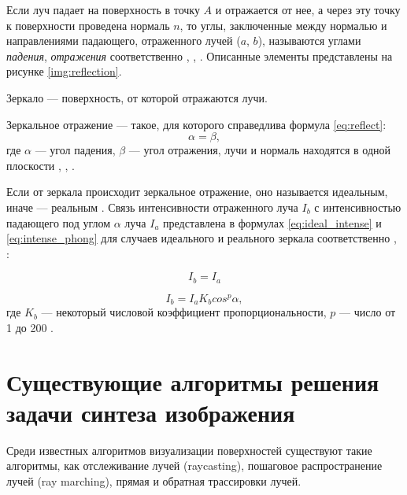 Если луч падает на поверхность в точку $A$ и отражается от нее, а через эту точку к поверхности проведена нормаль $n$, то углы, заключенные между нормалью и направлениями падающего, отраженного лучей ($a$, $b$), называются углами \textit{падения}, \textit{отражения} соответственно \cite{тюрин2005физика}, \cite{оптика20036}, \cite{rodionov}.
Описанные элементы представлены на рисунке \ref{img:reflection}.


Зеркало --- поверхность, от которой отражаются лучи.

Зеркальное отражение --- такое, для которого справедлива формула \ref{eq:reflect}:
\begin{equation}\label{eq:reflect}
	\alpha=\beta,
\end{equation}
где $\alpha$ --- угол падения, $\beta$ --- угол отражения, лучи и нормаль находятся в одной плоскости \cite{порев2002компьютерная}, \cite{оптика20036}, \cite{rodionov}.

Если от зеркала происходит зеркальное отражение, оно называется идеальным, иначе --- реальным \cite{порев2002компьютерная}. Связь интенсивности отраженного луча $I_b$ с интенсивностью падающего под углом $\alpha$ луча $I_a$ представлена в формулах \ref{eq:ideal_intense} и \ref{eq:intense_phong} для случаев идеального и реального зеркала соответственно \cite{порев2002компьютерная}, \cite{оптика20036}:

\begin{equation}\label{eq:ideal_intense}
	I_b=I_a
\end{equation}

\begin{equation}\label{eq:intense_phong}
	I_b=I_a K_b cos^p{\alpha},
\end{equation}
где $K_b$ --- некоторый числовой коэффициент пропорциональности, $p$ --- число от 1 до 200 \cite{порев2002компьютерная}.

\section{Существующие алгоритмы решения задачи синтеза изображения}

Среди известных алгоритмов визуализации поверхностей существуют такие алгоритмы, как отслеживание лучей (raycasting), пошаговое распространение лучей (ray marching), прямая и обратная трассировки лучей.

